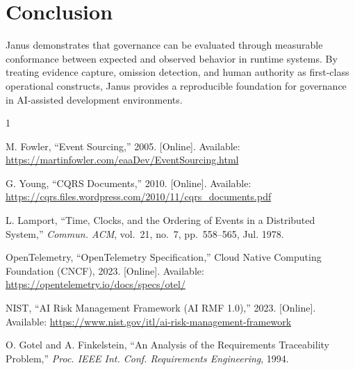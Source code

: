 \documentclass[conference]{IEEEtran}
\begin{document}
\section{Conclusion}

Janus demonstrates that governance can be evaluated through measurable conformance
between expected and observed behavior in runtime systems. By treating evidence
capture, omission detection, and human authority as first-class operational
constructs, Janus provides a reproducible foundation for governance in AI-assisted
development environments.

\begin{thebibliography}{1}

M. Fowler, ``Event Sourcing,'' 2005. [Online].
Available: \url{https://martinfowler.com/eaaDev/EventSourcing.html}

G. Young, ``CQRS Documents,'' 2010. [Online].
Available: \url{https://cqrs.files.wordpress.com/2010/11/cqrs_documents.pdf}

L. Lamport, ``Time, Clocks, and the Ordering of Events in a Distributed System,''
\emph{Commun. ACM}, vol.~21, no.~7, pp.~558--565, Jul. 1978.

OpenTelemetry, ``OpenTelemetry Specification,''
Cloud Native Computing Foundation (CNCF), 2023. [Online].
Available: \url{https://opentelemetry.io/docs/specs/otel/}

NIST, ``AI Risk Management Framework (AI RMF 1.0),'' 2023. [Online].
Available: \url{https://www.nist.gov/itl/ai-risk-management-framework}

O. Gotel and A. Finkelstein, ``An Analysis of the Requirements Traceability
Problem,'' \emph{Proc. IEEE Int. Conf. Requirements Engineering}, 1994.

\end{thebibliography}
\end{document}

